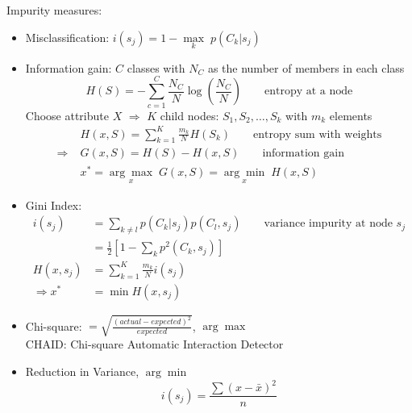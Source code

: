 Impurity measures:
\begin{itemize}
	\item Misclassification: $i(s_j) = 1 - \underset{k}{\max}\;p(C_k | s_j)$
	\item Information gain: $C$ classes with $N_C$ as the number of members in each class
	\begin{equation}
		H(S) = - \sum_{c=1}^{C} \frac{N_C}{N} \log \left(\frac{N_C}{N}\right) \qquad \text{entropy at a node}
	\end{equation}
	Choose attribute $X$ $\Rightarrow$ $K$ child nodes: $S_1, S_2, \dots, S_k$ with $m_k$ elements
	\begin{align}
		&H(x, S) =  \sum_{k=1}^{K} \frac{m_k}{N} H(S_k) \qquad \text{entropy sum with weights} \\
		\Rightarrow\; &G(x, S) = H(S) - H(x, S) \qquad \text{information gain}\\
		&x^* = \underset{x}{\arg\max}\;G(x, S) = \underset{x}{\arg\min}\;H(x, S)
	\end{align}
	\item Gini Index:
	\begin{align}
		i(s_j) &= \sum_{k \neq l} p(C_k | s_j) p(C_l, s_j) \qquad \text{variance impurity at node } s_j\\
		&= \frac{1}{2} \left[1- \sum_{k} p^2(C_k, s_j) \right]\\
		H(x, s_j) &= \sum_{k=1}^{K} \frac{m_k}{N} i(s_j)\\
		\Rightarrow x^* &= \min H(x, s_j)
	\end{align}
	\item Chi-square: $\displaystyle = \sqrt{\frac{(actual - expected)^2}{expected}}$, $\arg\max$\\
	CHAID: Chi-square Automatic Interaction Detector
	\item Reduction in Variance, $\arg\min$\\
	\begin{equation}
		i(s_j) = \frac{\sum (x-\bar{x})^2}{n}
	\end{equation}
\end{itemize}



